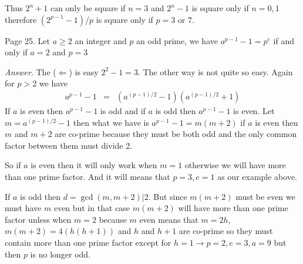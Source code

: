 \documentclass[aps,preprint,preprintnumbers,nofootinbib,showpacs,prd]{revtex4-1}
\newcommand{\nbea}{\begin{eqnarray*}}
\newcommand{\neea}{\end{eqnarray*}}
\begin{document}
Thus $2^n + 1$ can only be square if $n = 3$ and $2^n - 1$ is square only if $n = 0, 1$ therefore $(2^{p-1} - 1)/p$ is square only if $p = 3$ or $7$.

Page 25. Let $a \ge 2$ an integer and $p$ an odd prime, we have $a^{p-1} - 1 = p^e$ if and only if $a = 2$ and $p = 3$

{\it Answer}. The ($\Leftarrow$) is easy $2^2 - 1 = 3$. The other way is not quite so easy. Again for $p > 2$ we have 
%
\nbea
a^{p-1} - 1 & = & (a^{(p-1)/2} - 1)(a^{(p-1)/2} + 1)
\neea
%
If $a$ is even then $a^{p-1} - 1$ is odd and if $a$ is odd then $a^{p-1} - 1$ is even. Let $m = a^{(p-1)/2} - 1$ then what we have is $a^{p-1} - 1 = m(m+2)$ if $a$ is even then $m$ and $m + 2$ are co-prime because they must be both odd and the only common factor between them must divide 2. 

So if $a$ is even then it will only work when $m = 1$ otherwise we will have more than one prime factor. And it will means that $p=3, e=1$ as our example above.

If $a$ is odd then $d = \gcd(m, m+2) | 2$. But since $m(m+2)$ must be even we must have $m$ even but in that case $m(m + 2)$ will have more than one prime factor unless when $m = 2$ because $m$ even means that $m=2h$, $m(m + 2) = 4(h(h + 1))$ and $h$ and $h + 1$ are co-prime so they must contain more than one prime factor except for $h = 1 \to p = 2, e = 3, a = 9$ but then $p$ is no longer odd.
\end{document}

